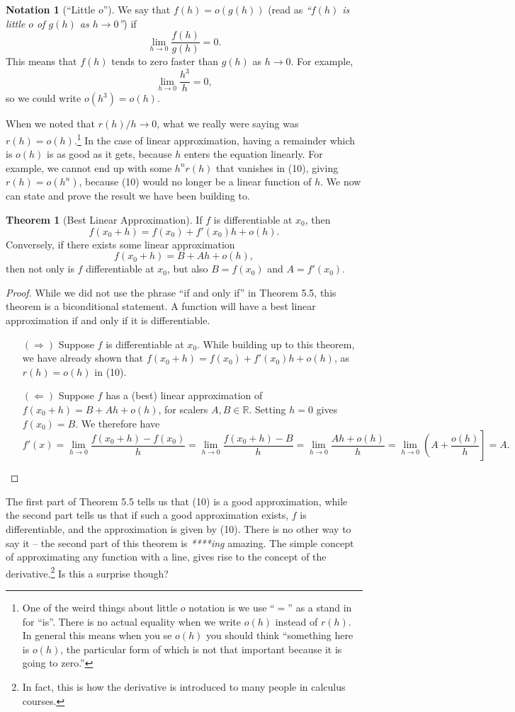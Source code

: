 \documentclass{article}
\newcommand{\R}{\mathbb{R}}
\theoremstyle{definition}
\newtheorem{theorem}{Theorem}[section]
\newtheorem{note}{Notation}[section]
\begin{document}
	\begin{note}[``Little $ o $'']
		We say that $ f(h)=o(g(h)) $ (read as \textit{\color{red}``$ f(h) $ is little $ o $ of $ g(h) $ as $ h\to 0 $''}) if $$ \lim\limits_{h\to 0} \frac{f(h)}{g(h)}=0.$$ This means that $ f(h) $ tends to zero faster than $ g(h) $ as $ h\to 0 $. For example, $$\lim\limits_{h\to 0}\frac{h^3}{h}=0 ,$$ so we could write $ o(h^3)=o(h) $.   
	\end{note}
	When we noted that $ r(h)/h\to 0 $, what we really were saying was $ r(h)=o(h) $.\footnote{One of the weird things about little $ o $ notation is we use ``$ = $'' as a stand in for ``is''. There is no actual equality when we write $ o(h) $ instead of $ r(h) $. In general this means when you se $ o(h) $ you should think ``something here is $ o(h) $, the particular form of which is not that important because it is going to zero.''} In the case of linear approximation, having a remainder which is $ o(h) $ is as good as it gets, because $ h $ enters the equation linearly. For example, we cannot end up with some $ h^nr(h) $ that vanishes in (10), giving $ r(h)=o(h^n) $, because (10) would no longer be a linear function of $ h $. We now can state and prove the result we have been building to.  
	\begin{theorem}[Best Linear Approximation]
		If $ f $ is differentiable at $ x_0 $, then $$f(x_0+h)=f(x_0)+f'(x_0)h+o(h) .$$ Conversely, if there exists some linear approximation $$ f(x_0+h)=B+Ah+o(h) ,$$ then not only is $ f $ differentiable at $ x_0 $, but also $ B=f(x_0) $ and $ A=f'(x_0) $. 
	\end{theorem}
	\begin{proof}
		While we did not use the phrase ``if and only if'' in Theorem 5.5, this theorem is a biconditional statement. A function will have a best linear approximation if and only if it is differentiable.
		\begin{enumerate}
			\item [$ (\Longrightarrow) $] Suppose $ f $ is differentiable at $ x_0 $. While building up to this theorem, we have already shown that $ f(x_0+h)=f(x_0)+f'(x_0)h+o(h) $, as $ r(h)=o(h) $ in (10).
			\item [$ (\Longleftarrow) $] Suppose $ f $ has a (best) linear approximation of $ f(x_0+h)=B+Ah+o(h)$, for scalers $ A,B\in\R $. Setting $ h=0 $ gives $f(x_0)=B $. We therefore have  $$f'(x)=\lim_{h\to0}\frac{f(x_0+h)-f(x_0)}{h}=\lim_{h\to0}\frac{f(x_0+h)-B}{h}=\lim_{h\to0}\frac{Ah+o(h)}{h}=\lim_{h\to0}\left(A+\frac{o(h)}{h}\right]=A .$$ 
		\end{enumerate}
		
	\end{proof}
	The first part of Theorem 5.5 tells us that (10) is a good approximation, while the second part tells us that if such a good approximation exists, $ f $ is differentiable, and the approximation is given by (10). There is no other way to say it -- the second part of this theorem is \textit{****ing} amazing. The simple concept of approximating any function with a line, gives rise to the concept of the derivative.\footnote{In fact, this is how the derivative is introduced to many people in calculus courses.} Is this a surprise though? 
	
\end{document}

